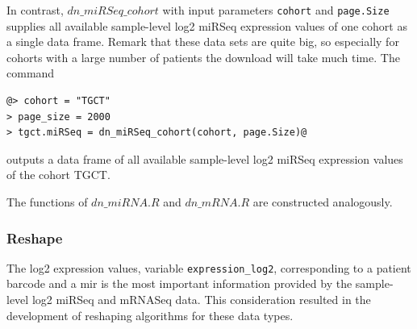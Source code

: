 \documentclass{TechReport}
\begin{document}
In contrast, $dn\_miRSeq\_cohort$ with input parameters {\tt cohort}
and {\tt page.Size} supplies all available sample-level log2 miRSeq
expression values of one cohort as a single data frame.  Remark that
these data sets are quite big, so especially for cohorts with a large
number of patients the download will take much time. The command
\begin{lstlisting}[style=base]
@> cohort = "TGCT"
> page_size = 2000
> tgct.miRSeq = dn_miRSeq_cohort(cohort, page.Size)@
\end{lstlisting}
outputs a data frame of all available sample-level log2 miRSeq expression values of
the cohort TGCT.

The functions of $dn\_miRNA.R$ and $dn\_mRNA.R$ are constructed analogously.

\subsubsection{Reshape}
The log2 expression values, variable {\tt expression\_log2}, corresponding to a
patient barcode and a mir is the most important information provided by 
the sample-level log2 miRSeq and mRNASeq data. This consideration resulted in the
development of reshaping algorithms for these data types.
\end{document}
